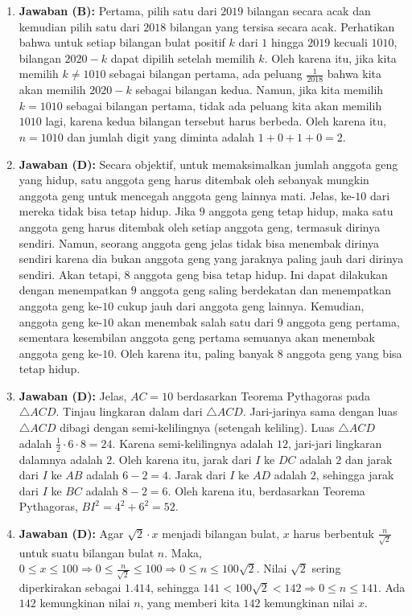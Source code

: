 \documentclass{article}
\begin{document}
\begin{enumerate}
\item \textbf{Jawaban (B):} Pertama, pilih satu dari $2019$ bilangan secara acak dan kemudian pilih satu dari $2018$ bilangan yang tersisa secara acak. Perhatikan bahwa untuk setiap bilangan bulat positif $k$ dari $1$ hingga $2019$ kecuali $1010$, bilangan $2020-k$ dapat dipilih setelah memilih $k$. Oleh karena itu, jika kita memilih $k\ne1010$ sebagai bilangan pertama, ada peluang $\frac{1}{2018}$ bahwa kita akan memilih $2020-k$ sebagai bilangan kedua. Namun, jika kita memilih $k=1010$ sebagai bilangan pertama, tidak ada peluang kita akan memilih $1010$ lagi, karena kedua bilangan tersebut harus berbeda. Oleh karena itu, $n=1010$ dan jumlah digit yang diminta adalah $1+0+1+0=2$.

\item \textbf{Jawaban (D):} Secara objektif, untuk memaksimalkan jumlah anggota geng yang hidup, satu anggota geng harus ditembak oleh sebanyak mungkin anggota geng untuk mencegah anggota geng lainnya mati. Jelas, ke-$10$ dari mereka tidak bisa tetap hidup. Jika $9$ anggota geng tetap hidup, maka satu anggota geng harus ditembak oleh setiap anggota geng, termasuk dirinya sendiri. Namun, seorang anggota geng jelas tidak bisa menembak dirinya sendiri karena dia bukan anggota geng yang jaraknya paling jauh dari dirinya sendiri. Akan tetapi, $8$ anggota geng bisa tetap hidup. Ini dapat dilakukan dengan menempatkan $9$ anggota geng saling berdekatan dan menempatkan anggota geng ke-$10$ cukup jauh dari anggota geng lainnya. Kemudian, anggota geng ke-$10$ akan menembak salah satu dari $9$ anggota geng pertama, sementara kesembilan anggota geng pertama semuanya akan menembak anggota geng ke-$10$. Oleh karena itu, paling banyak $8$ anggota geng yang bisa tetap hidup.

\item \textbf{Jawaban (D):} Jelas, $AC=10$ berdasarkan Teorema Pythagoras pada $\triangle ACD$. Tinjau lingkaran dalam dari $\triangle ACD$. Jari-jarinya sama dengan luas $\triangle ACD$ dibagi dengan semi-kelilingnya (setengah keliling). Luas $\triangle ACD$ adalah $\frac{1}{2}\cdot6\cdot8=24$. Karena semi-kelilingnya adalah $12$, jari-jari lingkaran dalamnya adalah $2$. Oleh karena itu, jarak dari $I$ ke $DC$ adalah $2$ dan jarak dari $I$ ke $AB$ adalah $6-2=4$. Jarak dari $I$ ke $AD$ adalah $2$, sehingga jarak dari $I$ ke $BC$ adalah $8-2=6$. Oleh karena itu, berdasarkan Teorema Pythagoras, $BI^{2}=4^{2}+6^{2}=52$.

\item \textbf{Jawaban (D):} Agar $\sqrt{2}\cdot x$ menjadi bilangan bulat, $x$ harus berbentuk $\frac{n}{\sqrt{2}}$ untuk suatu bilangan bulat $n$. Maka, $0\le x\le100\Rightarrow0\le\frac{n}{\sqrt{2}}\le100\Rightarrow0\le n\le100\sqrt{2}$. Nilai $\sqrt{2}$ sering diperkirakan sebagai $1.414$, sehingga $141<100\sqrt{2}<142\Rightarrow0\le n\le141$. Ada $142$ kemungkinan nilai $n$, yang memberi kita $142$ kemungkinan nilai $x$.


\end{enumerate}
\end{document}
